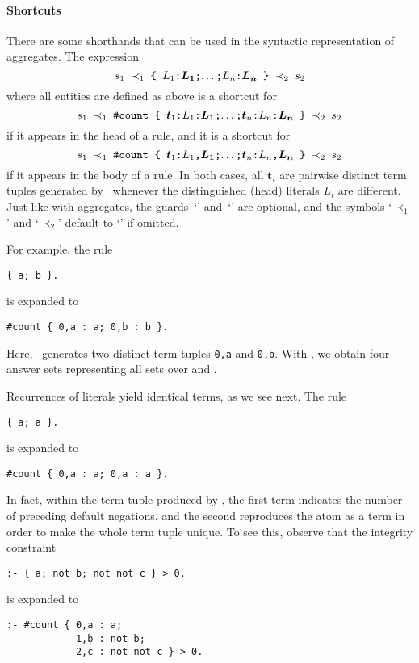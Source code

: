 \paragraph{Shortcuts}
There are some shorthands that can be used in the syntactic representation of aggregates.
%
The expression
%
\[\texttt{$s_1$~$\prec_1$~\{~$L_1$:$\boldsymbol{L_1}$;$\dots$;$L_n$:$\boldsymbol{L_n}$~\}~$\prec_2$~$s_2$}\]
%
where all entities are defined as above
is a shortcut for
%
\[\texttt{$s_1$~$\prec_1$~\#count \{ $\boldsymbol{t}_1$:$L_1$:$\boldsymbol{L_1}$;$\dots$;$\boldsymbol{t}_n$:$L_n$:$\boldsymbol{L_n}$~\}~$\prec_2$~$s_2$}\]
%
if it appears in the head of a rule, and
it is a shortcut for
%
\[\texttt{$s_1$~$\prec_1$~\#count~\{~$\boldsymbol{t}_1$:$L_1$,$\boldsymbol{L_1}$;$\dots$;$\boldsymbol{t}_n$:$L_n$,$\boldsymbol{L_n}$~\}~$\prec_2$~$s_2$}\]
%
if it appears in the body of a rule.
In both cases, all $\boldsymbol{t}_i$ are pairwise distinct term tuples generated by \gringo\
whenever the distinguished (head) literals $L_i$ are different.
%
Just like with aggregates, the guards~`' and~`' are optional, and the symbols `$\prec_1$' and `$\prec_2$' default to `\code{<=}' if omitted.

For example, the rule
\begin{lstlisting}[numbers=none]
{ a; b }.
\end{lstlisting}
is expanded to
\begin{lstlisting}[numbers=none]
#count { 0,a : a; 0,b : b }.
\end{lstlisting}
Here, \gringo\ generates two distinct term tuples \lstinline{0,a} and \lstinline{0,b}.
With \clingo, we obtain four answer sets representing all sets over \code{a} and .

Recurrences of literals yield identical terms, as we see next.
The rule
\begin{lstlisting}[numbers=none]
{ a; a }.
\end{lstlisting}
is expanded to
\begin{lstlisting}[numbers=none]
#count { 0,a : a; 0,a : a }.
\end{lstlisting}

In fact, within the term tuple produced by \gringo,
the first term indicates the number of preceding default negations,
and the second reproduces the atom as a term in order to make the whole term tuple unique.
%
To see this, observe that the integrity constraint
\begin{lstlisting}[numbers=none]
:- { a; not b; not not c } > 0.
\end{lstlisting}
is expanded to
\begin{lstlisting}[numbers=none]
:- #count { 0,a : a; 
            1,b : not b;
            2,c : not not c } > 0.
\end{lstlisting}


